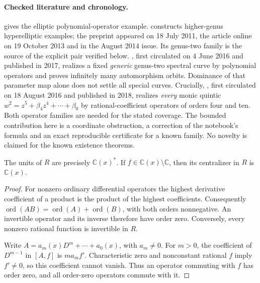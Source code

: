 \paragraph{Checked literature and chronology.}
\citet[Lemma~5.4, Proposition~5.5 and Remark~5.6, pp.~221--223]{dixmier1968weyl} gives the elliptic polynomial-operator example. \citet[Theorems~2--3 and Example~(a), preprint p.~11]{mironov2011selfadjoint} constructs higher-genus hyperelliptic examples; the preprint appeared on 18 July 2011, the article online on 19 October 2013 and in the August 2014 issue. Its genus-two family is the source of the explicit pair verified below. \citet[Theorem~1 and its parameter-map proof]{davletshinamironov2016orbits}, first circulated on 4 June 2016 and published in 2017, realizes a fixed \emph{generic} genus-two spectral curve by polynomial operators and proves infinitely many automorphism orbits. Dominance of that parameter map alone does not settle all special curves. Crucially, \citet[Theorem~3(2), using the union of Theorems~1 and~2]{oganesyan2016rational}, first circulated on 18 August 2016 and published in 2018, realizes \emph{every} monic quintic \(w^2=z^5+\beta_4z^4+\cdots+\beta_0\) by rational-coefficient operators of orders four and ten. Both operator families are needed for the stated coverage. The bounded contribution here is a coordinate obstruction, a correction of the notebook's formula and an exact reproducible certificate for a known family. No novelty is claimed for the known existence theorems.

\begin{lemma}\ours\quad
\label{lem:units}
The units of \(R\) are precisely \(\mathbb C(x)^*\). If \(f\in\mathbb C(x)\setminus\mathbb C\), then its centralizer in \(R\) is \(\mathbb C(x)\).
\end{lemma}
\begin{proof}
For nonzero ordinary differential operators the highest derivative coefficient of a product is the product of the highest coefficients. Consequently
\(\operatorname{ord}(AB)=\operatorname{ord}(A)+\operatorname{ord}(B)\), with both orders nonnegative. An invertible operator and its inverse therefore have order zero. Conversely, every nonzero rational function is invertible in \(R\).

Write \(A=a_m(x)D^m+\cdots+a_0(x)\), with \(a_m\ne0\). For \(m>0\), the coefficient of \(D^{m-1}\) in \([A,f]\) is \(m a_m f'\). Characteristic zero and nonconstant rational \(f\) imply \(f'\ne0\), so this coefficient cannot vanish. Thus an operator commuting with \(f\) has order zero, and all order-zero operators commute with it.
\end{proof}

